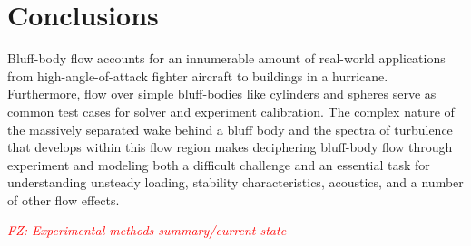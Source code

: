 \documentclass[journal]{new-aiaa}
\begin{document}


















\section{Conclusions}

Bluff-body flow accounts for an innumerable amount of real-world applications from high-angle-of-attack fighter aircraft to buildings in a hurricane. Furthermore, flow over simple bluff-bodies like cylinders and spheres serve as common test cases for solver and experiment calibration. The complex nature of the massively separated wake behind a bluff body and the spectra of turbulence that develops within this flow region makes deciphering bluff-body flow through experiment and modeling both a difficult challenge and an essential task for understanding unsteady loading, stability characteristics, acoustics, and a number of other flow effects.

\textcolor{red}{\emph{FZ: Experimental methods summary/current state}}
\end{document}
